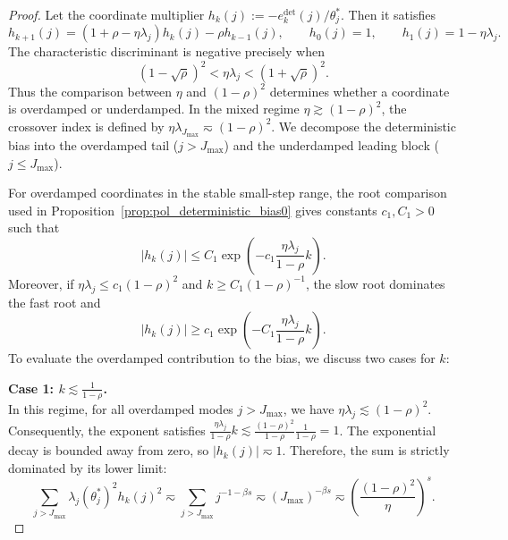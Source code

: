 \begin{proof}
Let the coordinate multiplier $h_k(j):= -e_k^{\mathrm{det}}(j)/\theta_j^*$. Then it satisfies
\[
    h_{k+1}(j)=(1+\rho-\eta\lambda_j)h_k(j)-\rho h_{k-1}(j),
    \qquad
    h_0(j)=1,
    \qquad
    h_1(j)=1-\eta\lambda_j.
\]
The characteristic discriminant is negative precisely when
\[
    (1-\sqrt\rho)^2<\eta\lambda_j<(1+\sqrt\rho)^2.
\]
Thus the comparison between $\eta$ and $(1-\rho)^2$ determines whether a coordinate is overdamped or underdamped. In the mixed regime $\eta \gtrsim (1-\rho)^2$, the crossover index is defined by $\eta\lambda_{J_{\max}} \eqsim (1-\rho)^2$. We decompose the deterministic bias into the overdamped tail ($j > J_{\max}$) and the underdamped leading block ($j \le J_{\max}$).

For overdamped coordinates in the stable small-step range, the root comparison used in Proposition~\ref{prop:pol_deterministic_bias0} gives constants $c_1,C_1>0$ such that
\begin{equation}
\label{eq:pol_momentum_overdamped_multiplier_upper}
    |h_k(j)|
    \le
    C_1\exp\left(-c_1\frac{\eta\lambda_j}{1-\rho}k\right).
\end{equation}
Moreover, if $\eta\lambda_j\le c_1(1-\rho)^2$ and $k\ge C_1(1-\rho)^{-1}$, the slow root dominates the fast root and
\begin{equation*}
    |h_k(j)|
    \ge
    c_1\exp\left(-C_1\frac{\eta\lambda_j}{1-\rho}k\right).
\end{equation*}
To evaluate the overdamped contribution to the bias, we discuss two cases for $k$:

\textbf{Case 1: $k \lesssim \frac{1}{1-\rho}$.} \\
In this regime, for all overdamped modes $j > J_{\max}$, we have $\eta\lambda_j \lesssim (1-\rho)^2$. \\
Consequently, the exponent satisfies $\frac{\eta\lambda_j}{1-\rho}k \lesssim \frac{(1-\rho)^2}{1-\rho}\frac{1}{1-\rho} = 1$. The exponential decay is bounded away from zero, so $|h_k(j)| \eqsim 1$. Therefore, the sum is strictly dominated by its lower limit:
\[
    \sum_{j > J_{\max}} \lambda_j(\theta_j^*)^2 h_k(j)^2 \eqsim \sum_{j > J_{\max}} j^{-1-\beta s} \eqsim (J_{\max})^{-\beta s} \eqsim \left(\frac{(1-\rho)^2}{\eta}\right)^s.
\]


\end{proof}
